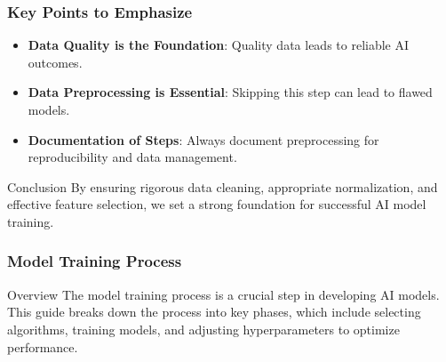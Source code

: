 \documentclass{beamer}
\begin{document}
\begin{frame}[fragile]
    \frametitle{Key Points to Emphasize}

    \begin{itemize}
        \item \textbf{Data Quality is the Foundation}: Quality data leads to reliable AI outcomes.
        \item \textbf{Data Preprocessing is Essential}: Skipping this step can lead to flawed models.
        \item \textbf{Documentation of Steps}: Always document preprocessing for reproducibility and data management.
    \end{itemize}

    \begin{block}{Conclusion}
        By ensuring rigorous data cleaning, appropriate normalization, and effective feature selection, we set a strong foundation for successful AI model training.
    \end{block}
\end{frame}

\begin{frame}
    \frametitle{Model Training Process}
    \begin{block}{Overview}
        The model training process is a crucial step in developing AI models. This guide breaks down the process into key phases, which include selecting algorithms, training models, and adjusting hyperparameters to optimize performance.
    \end{block}
\end{frame}
\end{document}
